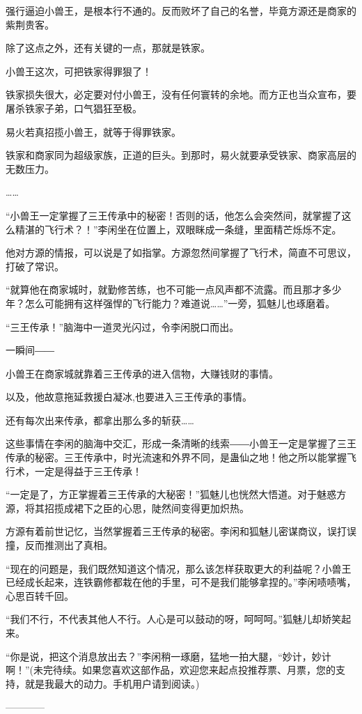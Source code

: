 \begin{this_body}
强行逼迫小兽王，是根本行不通的。反而败坏了自己的名誉，毕竟方源还是商家的紫荆贵客。

除了这点之外，还有关键的一点，那就是铁家。

小兽王这次，可把铁家得罪狠了！

铁家损失很大，必定要对付小兽王，没有任何寰转的余地。而方正也当众宣布，要屠杀铁家子弟，口气猖狂至极。

易火若真招揽小兽王，就等于得罪铁家。

铁家和商家同为超级家族，正道的巨头。到那时，易火就要承受铁家、商家高层的无数压力。

……

“小兽王一定掌握了三王传承中的秘密！否则的话，他怎么会突然间，就掌握了这么精湛的飞行术？！”李闲坐在位置上，双眼眯成一条缝，里面精芒烁烁不定。

他对方源的情报，可以说是了如指掌。方源忽然间掌握了飞行术，简直不可思议，打破了常识。

“就算他在商家城时，就勤修苦练，也不可能一点风声都不流露。而且那才多少年？怎么可能拥有这样强悍的飞行能力？难道说……”一旁，狐魅儿也琢磨着。

“三王传承！”脑海中一道灵光闪过，令李闲脱口而出。

一瞬间――

小兽王在商家城就靠着三王传承的进入信物，大赚钱财的事情。

以及，他故意拖延救援白凝冰,也要进入三王传承的事情。

还有每次出来传承，都拿出那么多的斩获……

这些事情在李闲的脑海中交汇，形成一条清晰的线索――小兽王一定是掌握了三王传承的秘密。三王传承中，时光流速和外界不同，是蛊仙之地！他之所以能掌握飞行术，一定是得益于三王传承！

“一定是了，方正掌握着三王传承的大秘密！”狐魅儿也恍然大悟道。对于魅惑方源，将其招揽成裙下之臣的心思，陡然间变得更加炽热。

方源有着前世记忆，当然掌握着三王传承的秘密。李闲和狐魅儿密谋商议，误打误撞，反而推测出了真相。

“现在的问题是，我们既然知道这个情况，那么该怎样获取更大的利益呢？小兽王已经成长起来，连铁霸修都栽在他的手里，可不是我们能够拿捏的。”李闲啧啧嘴，心思百转千回。

“我们不行，不代表其他人不行。人心是可以鼓动的呀，呵呵呵。”狐魅儿却娇笑起来。

“你是说，把这个消息放出去？”李闲稍一琢磨，猛地一拍大腿，“妙计，妙计啊！”(未完待续。如果您喜欢这部作品，欢迎您来起点投推荐票、月票，您的支持，就是我最大的动力。手机用户请到阅读。)

------------

\end{this_body}

